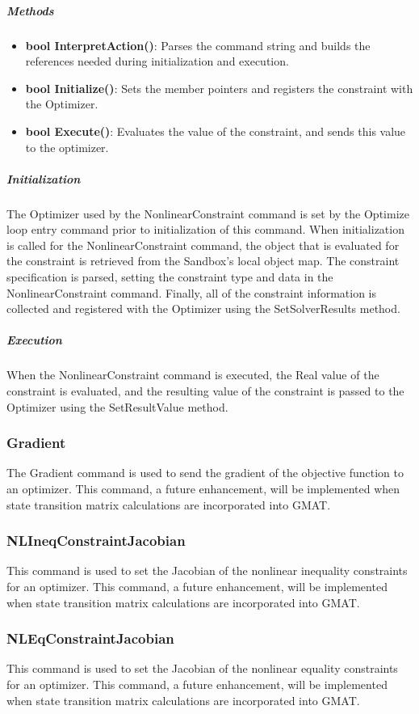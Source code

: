 \subparagraph{Methods}

\begin{itemize}
\item \textbf{bool InterpretAction()}:  Parses the command string and builds the references needed
during initialization and execution.
\item \textbf{bool Initialize()}:   Sets the member pointers and registers the constraint with the
Optimizer.
\item \textbf{bool Execute()}:  Evaluates the value of the constraint, and sends this value to the
optimizer.
\end{itemize}

\subparagraph{Initialization}  The Optimizer used by the NonlinearConstraint command is set by the
Optimize loop entry command prior to initialization of this command. When initialization is called
for the NonlinearConstraint command, the object that is evaluated for the constraint is retrieved
from the Sandbox's local object map.  The constraint specification is parsed, setting the
constraint type and data in the NonlinearConstraint command.  Finally, all of the constraint
information is collected and registered with the Optimizer using the SetSolverResults method.

\subparagraph{Execution}  When the NonlinearConstraint command is executed, the Real value of the
constraint is evaluated, and the resulting value of the constraint is passed to the Optimizer using
the SetResultValue method.

\subsubsection{Gradient}

The Gradient command is used to send the gradient of the objective function to an optimizer.  This
command, a future enhancement, will be implemented when state transition matrix calculations are
incorporated into GMAT.

\subsubsection{NLIneqConstraintJacobian}

This command is used to set the Jacobian of the nonlinear inequality constraints for an optimizer.
This command, a future enhancement, will be implemented when state transition matrix calculations
are incorporated into GMAT.

\subsubsection{NLEqConstraintJacobian}

This command is used to set the Jacobian of the nonlinear equality constraints for an optimizer.
This command, a future enhancement, will be implemented when state transition matrix calculations
are incorporated into GMAT.
